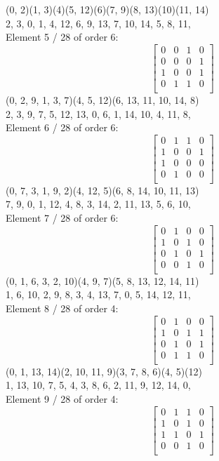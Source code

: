 (0, 2)(1, 3)(4)(5, 12)(6)(7, 9)(8, 13)(10)(11, 14)\\
2, 3, 0, 1, 4, 12, 6, 9, 13, 7, 10, 14, 5, 8, 11, \\
Element     5 / 28 of order 6:
$$
\left[
\begin{array}{*{4}{r}}
0 & 0 & 1 & 0\\
0 & 0 & 0 & 1\\
1 & 0 & 0 & 1\\
0 & 1 & 1 & 0\\
\end{array}
\right]
$$
(0, 2, 9, 1, 3, 7)(4, 5, 12)(6, 13, 11, 10, 14, 8)\\
2, 3, 9, 7, 5, 12, 13, 0, 6, 1, 14, 10, 4, 11, 8, \\
Element     6 / 28 of order 6:
$$
\left[
\begin{array}{*{4}{r}}
0 & 1 & 1 & 0\\
1 & 0 & 0 & 1\\
1 & 0 & 0 & 0\\
0 & 1 & 0 & 0\\
\end{array}
\right]
$$
(0, 7, 3, 1, 9, 2)(4, 12, 5)(6, 8, 14, 10, 11, 13)\\
7, 9, 0, 1, 12, 4, 8, 3, 14, 2, 11, 13, 5, 6, 10, \\
Element     7 / 28 of order 6:
$$
\left[
\begin{array}{*{4}{r}}
0 & 1 & 0 & 0\\
1 & 0 & 1 & 0\\
0 & 1 & 0 & 1\\
0 & 0 & 1 & 0\\
\end{array}
\right]
$$
(0, 1, 6, 3, 2, 10)(4, 9, 7)(5, 8, 13, 12, 14, 11)\\
1, 6, 10, 2, 9, 8, 3, 4, 13, 7, 0, 5, 14, 12, 11, \\
Element     8 / 28 of order 4:
$$
\left[
\begin{array}{*{4}{r}}
0 & 1 & 0 & 0\\
1 & 0 & 1 & 1\\
0 & 1 & 0 & 1\\
0 & 1 & 1 & 0\\
\end{array}
\right]
$$
(0, 1, 13, 14)(2, 10, 11, 9)(3, 7, 8, 6)(4, 5)(12)\\
1, 13, 10, 7, 5, 4, 3, 8, 6, 2, 11, 9, 12, 14, 0, \\
Element     9 / 28 of order 4:
$$
\left[
\begin{array}{*{4}{r}}
0 & 1 & 1 & 0\\
1 & 0 & 1 & 0\\
1 & 1 & 0 & 1\\
0 & 0 & 1 & 0\\
\end{array}
\right]
$$
